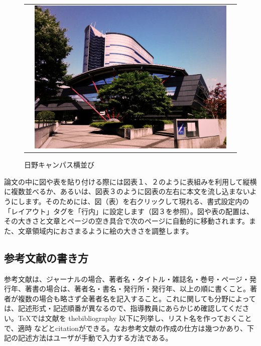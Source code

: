\documentclass[a4paper]{jsarticle}
\begin{document}
\begin{figure}[tb]
\begin{center}
\begin{tabular}{ccc}
    &
    \begin{minipage}{0.3\hsize}
      \includegraphics[width=\hsize]{./images/sample.jpg}
    \end{minipage}

  \end{tabular}
    \caption{日野キャンパス横並び}
    \label{fig:tmu_hino_yokonarabi}
  \end{center}
\end{figure}


論文の中に図や表を貼り付ける際には図表１、２のように表組みを利用して縦横に複数並べるか、あるいは、図表３のように図表の左右に本文を流し込まないようにします。そのためには、図（表）を右クリックして現れる、書式設定内の「レイアウト」タグを「行内」に設定します（図３を参照）。図や表の配置は、その大きさと文章とページの空き具合で次のページに自動的に移動されます。また、文章領域内におさまるように絵の大きさを調整します。

\subsection{参考文献の書き方}
参考文献は、ジャーナルの場合、著者名・タイトル・雑誌名・巻号・ページ・発行年、著書の場合は、著者名・書名・発行所・発行年、以上の順に書くこと。著者が複数の場合も略さず全著者名を記入すること。これに関しても分野によっては、記述形式・記述順番が異なるので、指導教員にあらかじめ確認してください。\TeX では文献を thebibliography 以下に列挙し、リスト名を作っておくことで、適時\cite{sample} などとcitationができる。なお参考文献の作成の仕方は幾つかあり、下記の記述方法はユーザが手動で入力する方法である。
\end{document}
